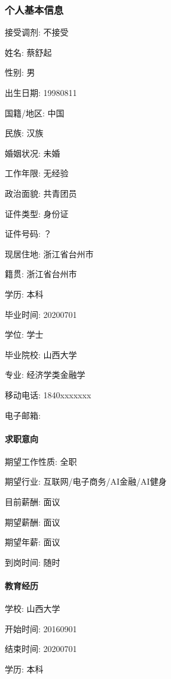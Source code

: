 \documentclass[letterpaper,10pt,english]{sphinxmanual}
\begin{document}
\subsubsection{个人基本信息}
\label{\detokenize{get_started:id10}}
接受调剂: 不接受

姓名: 蔡舒起

性别: 男

出生日期: 1998\sphinxhyphen{}08\sphinxhyphen{}11

国籍/地区: 中国

民族: 汉族

婚姻状况: 未婚

工作年限: 无经验

政治面貌: 共青团员

证件类型: 身份证

证件号码: ？

现居住地: 浙江省\sphinxhyphen{}台州市

籍贯: 浙江省\sphinxhyphen{}台州市

学历: 本科

毕业时间: 2020\sphinxhyphen{}07\sphinxhyphen{}01

学位: 学士

毕业院校: 山西大学

专业: 经济学类\sphinxhyphen{}金融学

移动电话: 1840xxxxxxx

电子邮箱: 


\paragraph{求职意向}
\label{\detokenize{get_started:id11}}
期望工作性质: 全职

期望行业: 互联网/电子商务/AI金融/AI健身

目前薪酬: 面议

期望薪酬: 面议

期望年薪: 面议

到岗时间: 随时


\paragraph{教育经历}
\label{\detokenize{get_started:id12}}
学校: 山西大学

开始时间: 2016\sphinxhyphen{}09\sphinxhyphen{}01

结束时间: 2020\sphinxhyphen{}07\sphinxhyphen{}01

学历: 本科
\end{document}
